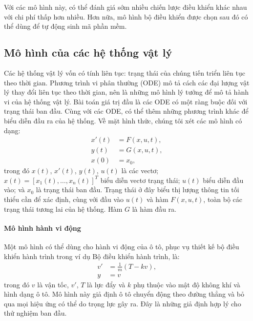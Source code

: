 Với các mô hình này, có thể đánh giá sớm nhiều chiến lược điều khiển khác nhau với chi phí thấp hơn nhiều. Hơn nữa, mô hình bộ điều khiển được chọn sau đó có thể dùng để tự động sinh mã phần mềm.

\subsection{Mô hình của các hệ thống vật lý}
Các hệ thống vật lý vốn có tính liên tục: trạng thái của chúng tiến triển liên tục theo thời gian. Phương trình vi phân thường (ODE) mô tả cách các đại lượng vật lý thay đổi liên tục theo thời gian, nên là những mô hình lý tưởng để mô tả hành vi của hệ thống vật lý. Bài toán giá trị đầu là các ODE có một ràng buộc đối với trạng thái ban đầu. Cùng với các ODE, có thể thêm những phương trình khác để biểu diễn đầu ra của hệ thống. Về mặt hình thức, chúng tôi xét các mô hình có dạng:
\begin{equation}\begin{aligned}
x'(t)&=F(x,u,t),\\y(t)&=G(x,u,t),\\x(0)&=x_0,
\end{aligned}\tag{4.1}\end{equation}
trong đó $x(t)$, $x'(t)$, $y(t)$, $u(t)$ là các vectơ; $x(t)=[x_1(t),\ldots,x_n(t)]^T$ biểu diễn vectơ trạng thái; $u(t)$ biểu diễn đầu vào; và $x_0$ là trạng thái ban đầu. Trạng thái ở đây biểu thị lượng thông tin tối thiểu cần để xác định, cùng với đầu vào $u(t)$ và hàm $F(x,u,t)$, toàn bộ các trạng thái tương lai của hệ thống. Hàm $G$ là hàm đầu ra.

\paragraph{Mô hình hành vi động}
Một mô hình có thể dùng cho hành vi động của ô tô, phục vụ thiết kế bộ điều khiển hành trình trong ví dụ Bộ điều khiển hành trình, là:
\begin{equation}\begin{aligned}v'&=\frac{1}{m}(T-kv),\\y&=v\end{aligned}\tag{4.2}\end{equation}
trong đó $v$ là vận tốc, $v'$, $T$ là lực đẩy và $k$ phụ thuộc vào mật độ không khí và hình dạng ô tô. Mô hình này giả định ô tô chuyển động theo đường thẳng và bỏ qua mọi hiệu ứng có thể do trọng lực gây ra. Đây là những giả định hợp lý cho thử nghiệm ban đầu.

